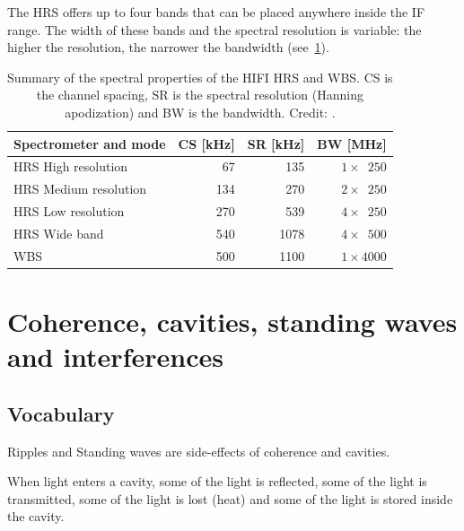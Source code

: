 The HRS offers up to four bands that can be placed anywhere inside the IF range.
The width of these bands and the spectral resolution is variable: the higher the resolution, the narrower the bandwidth (see~\cref{tab:wbs_hrs}).

\begin{table}[hb]
    \centering
    \begin{tabular}{lrrr}
    \toprule
    Spectrometer and mode & 
    CS [\si{\kilo\hertz}]
    &
    SR [\si{\kilo\hertz}]
    &
    BW [\si{\mega\hertz}]\\
    \midrule
    HRS High resolution   &  67 &  135 & $1 \times \phantom{0}250$\\
    HRS Medium resolution & 134 &  270 & $2 \times \phantom{0}250$\\
    HRS Low resolution    & 270 &  539 & $4 \times \phantom{0}250$\\
    HRS Wide band         & 540 & 1078 & $4 \times \phantom{0}500$\\
    \midrule
    WBS                   & 500 & 1100 & $1 \times 4000$\\
    \bottomrule
    \end{tabular}
    \caption{
        Summary of the spectral properties of the HIFI HRS and WBS.
        CS is the channel spacing,
        SR is the spectral resolution (Hanning apodization) and
        BW is the bandwidth.
        Credit: \textcite{belgacem2004high}.
    }
    \label{tab:wbs_hrs}
\end{table}


\FloatBarrier
\section{Coherence, cavities, standing waves and interferences}
\label{sec:coherence}

\subsection{Vocabulary}

Ripples and Standing waves are side-effects of coherence and cavities.

When light enters a cavity, some of the light is reflected, some of the light is transmitted, some of the light is lost (heat) and some of the light is stored inside the cavity.

